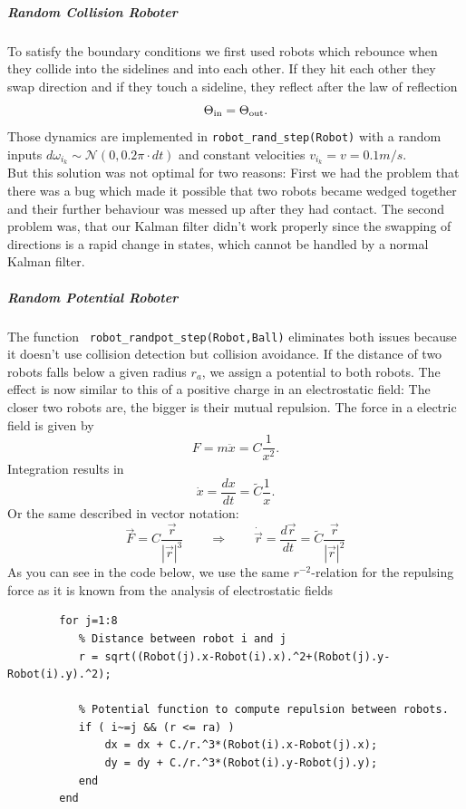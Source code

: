 %

\subparagraph{Random Collision Roboter} To satisfy the boundary conditions we first used robots which rebounce when they collide into the sidelines and into each other. If they hit each other they swap direction 
%
and if they touch a sideline, they reflect after the law of reflection 
\[ \Theta_{\textnormal{in}} = \Theta_{\textnormal{out}}.
\]
Those dynamics are implemented in \texttt{robot\_rand\_step(Robot)} with a random inputs $d\omega_{i_k} \sim \mathcal{N}(0,0.2\pi \cdot dt)$ and constant velocities $v_{i_k} = v = 0.1 m/s$.\\

But this solution was not optimal for two reasons: First we had the problem that there was a bug which made it possible that two robots became wedged together and their further behaviour was messed up after they had contact. The second problem was, that our Kalman filter didn't work properly since the swapping of directions is a rapid change in states, which cannot be handled by a normal Kalman filter. 

\subparagraph{Random Potential Roboter} 
The function \texttt{ robot\_randpot\_step(Robot,Ball)} eliminates both issues because it doesn't use collision detection but collision avoidance. If the distance of two robots falls below a given radius $r_a$, we assign a potential to both robots. The effect is now similar to this of a positive charge in an electrostatic field: The closer two robots are, the bigger is their mutual repulsion. The force in a electric field is given by
	\[ F = m\ddot{x} = C \frac{1}{x^2}.
	\]
Integration results in
	\[ \dot{x} = \frac{dx}{dt} = \tilde{C} \frac{1}{x}.\]
Or the same described in vector notation:
	\[	\vec{F} = C \frac{\vec{r}}{|\vec{r}|^3} \qquad \Rightarrow \qquad \dot{\vec{r}} = \frac{d \vec{r}}{dt} = %
			\tilde{C} \frac{\vec{r}}{|\vec{r}|^2} %
	\]
As you can see in the code below, we use the same \(r^{-2}\)-relation for the repulsing force as it is known from the analysis of electrostatic fields
\begin{lstlisting}
        for j=1:8
           % Distance between robot i and j
           r = sqrt((Robot(j).x-Robot(i).x).^2+(Robot(j).y-Robot(i).y).^2);
            
           % Potential function to compute repulsion between robots.
           if ( i~=j && (r <= ra) )
               dx = dx + C./r.^3*(Robot(i).x-Robot(j).x);
               dy = dy + C./r.^3*(Robot(i).y-Robot(j).y);
           end
        end
\end{lstlisting}

